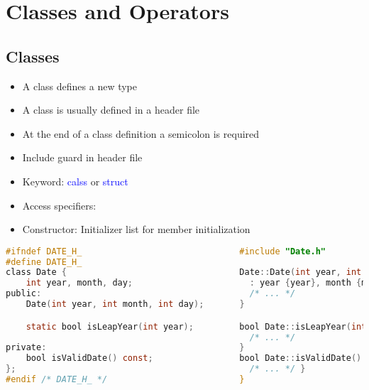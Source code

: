 
\section{Classes and Operators}

\subsection{Classes}
\begin{itemize}
    \item A class defines a new type
    \item A class is usually defined in a header file
    \item At the end of a class definition a semicolon is required
    \item Include guard in header file
    \item Keyword: \textcolor{blue}{calss} or \textcolor{blue}{struct}
    \item Access specifiers:
    \item Constructor: Initializer list for member initialization
\end{itemize}
\begin{lstlisting}[style=frame, style= linenumbers, language=C]
#ifndef DATE_H_                               #include "Date.h"
#define DATE_H_
class Date {                                  Date::Date(int year, int month, int day)
    int year, month, day;                       : year {year}, month {month}, day {day} {
public:                                         /* ... */
    Date(int year, int month, int day);       }

    static bool isLeapYear(int year);         bool Date::isLeapYear(int year) {
                                                /* ... */
private:                                      }
    bool isValidDate() const;                 bool Date::isValidDate() const {
};                                              /* ... */ }
#endif /* DATE_H_ */                          }
\end{lstlisting}

